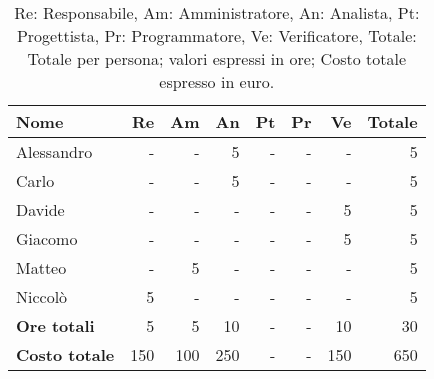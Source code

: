 \begin{table}[H]
	\centering
	\begin{tabular}{l|r|r|r|r|r|r|r}
		\textbf{Nome}         & \textbf{Re} & \textbf{Am} & \textbf{An} & \textbf{Pt} & \textbf{Pr} & \textbf{Ve} & \textbf{Totale} \\
		\hline
		Alessandro            & -           & -           & 5           & -           & -           & -           & 5               \\
		Carlo                 & -           & -           & 5           & -           & -           & -           & 5               \\
		Davide                & -           & -           & -           & -           & -           & 5           & 5               \\
		Giacomo               & -           & -           & -           & -           & -           & 5           & 5               \\
		Matteo                & -           & 5           & -           & -           & -           & -           & 5               \\
		Niccolò               & 5           & -           & -           & -           & -           & -           & 5               \\
		\hline
		\textbf{Ore totali}   & 5           & 5           & 10          & -           & -           & 10          & 30              \\
		\textbf{Costo totale} & 150         & 100         & 250         & -           & -           & 150         & 650
	\end{tabular}
	\caption{Re: Responsabile, Am: Amministratore, An: Analista, Pt: Progettista,
		Pr: Programmatore, Ve: Verificatore, Totale: Totale per persona; valori espressi in ore; Costo totale espresso in euro.}
\end{table}

